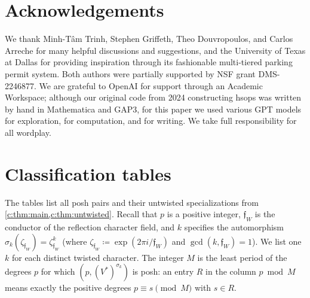 \documentclass[10pt,a4paper]{amsart}
\newcommand{\defeq}{\coloneqq}
\theoremstyle{definition}
\begin{document}
\section*{Acknowledgements}
We thank Minh-T\^am Trinh, Stephen Griffeth, Theo Douvropoulos, and Carlos Arreche for many
helpful discussions and suggestions, and the University of Texas at Dallas for providing inspiration through its fashionable multi-tiered parking permit system. Both authors were partially supported by
NSF grant DMS-2246877. We are grateful to OpenAI for support through an Academic Workspace; although our original code from 2024 constructing hsops was written by hand in Mathematica and GAP3, for this paper we used various GPT models for exploration, for computation, and for writing.  We take full responsibility for all wordplay.%

\appendix
\section{Classification tables}\label{sec:tables}

The tables list all posh pairs and their untwisted specializations
from \cref{c:thm:main,c:thm:untwisted}. %
Recall that $p$ is a positive integer, $\mathfrak f_W$ is the conductor of the reflection character
field, and $k$ specifies the automorphism
$\sigma_k(\zeta_{\mathfrak f_W})=\zeta_{\mathfrak f_W}^k$ (where
$\zeta_{\mathfrak f_W}\defeq\exp(2\pi i/\mathfrak f_W)$ and
$\gcd(k,\mathfrak f_W)=1$). We list one $k$ for each distinct twisted
character. The integer $M$ is the least period of the degrees $p$
for which $(p,(V^*)^{\sigma_k})$ is posh: an entry $R$
in the column $p\bmod M$ means exactly the positive degrees
$p\equiv s\pmod M$ with $s\in R$. %
\end{document}
